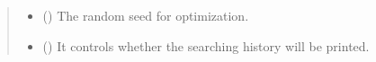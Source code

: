 \documentclass[letterpaper,10pt,english]{sphinxmanual}
\begin{document}
\begin{fulllineitems}
\begin{quote}
\begin{description}
\begin{itemize}
\item {} 
 (\sphinxstyleliteralemphasis{\sphinxupquote{, }}\sphinxstyleliteralemphasis{\sphinxupquote{, }}) \textendash{} The random seed for optimization.

\item {} 
 (\sphinxstyleliteralemphasis{\sphinxupquote{, }}\sphinxstyleliteralemphasis{\sphinxupquote{, }}) \textendash{} It controls whether the searching history will be printed.

\end{itemize}

\end{description}\end{quote}


\end{fulllineitems}
\end{document}

